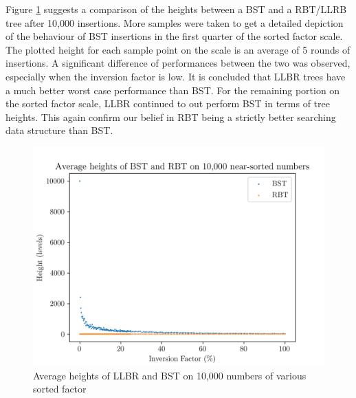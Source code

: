 \documentclass[titlepage, 12pt]{article}
\begin{document}
Figure \ref{fig:near} suggests a comparison of the heights between a BST and a
RBT/LLRB tree after 10,000 insertions. More samples were taken to get a detailed
depiction of the behaviour of BST insertions in the first quarter of the sorted
factor scale. The plotted height for each sample point on the scale is an
average of 5 rounds of insertions. A significant difference of performances
between the two was observed, especially when the inversion factor is low. It is
concluded that LLBR trees have a much better worst case performance than BST.
For the remaining portion on the sorted factor scale, LLBR continued to out
perform BST in terms of tree heights. This again confirm our belief in RBT being
a strictly better searching data structure than BST.
\begin{figure}[h]
  \centering
  \includegraphics[width=0.8\linewidth]{near}
  \caption{Average heights of LLBR and BST on 10,000 numbers of various sorted factor}
  \label{fig:near}
\end{figure}
\end{document}

